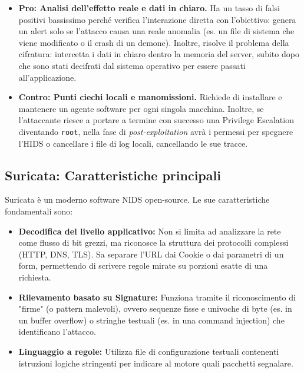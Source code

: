 \documentclass[12pt,a4paper]{report}
\begin{document}
	\begin{itemize}
		\item \textbf{Pro: Analisi dell'effetto reale e dati in chiaro.} Ha un tasso di falsi positivi bassissimo perché verifica l'interazione diretta con l'obiettivo: genera un alert solo se l'attacco causa una reale anomalia (es. un file di sistema che viene modificato o il crash di un demone). Inoltre, risolve il problema della cifratura: intercetta i dati in chiaro dentro la memoria del server, subito dopo che sono stati decifrati dal sistema operativo per essere passati all'applicazione.
		\item \textbf{Contro: Punti ciechi locali e manomissioni.} Richiede di installare e mantenere un agente software per ogni singola macchina. Inoltre, se l'attaccante riesce a portare a termine con successo una Privilege Escalation diventando \texttt{root}, nella fase di \textit{post-exploitation} avrà i permessi per spegnere l'HIDS o cancellare i file di log locali, cancellando le sue tracce.
	\end{itemize}
	
	\subsection{Suricata: Caratteristiche principali}
	Suricata è un moderno software NIDS open-source. Le sue caratteristiche fondamentali sono:
	\begin{itemize}
		\item \textbf{Decodifica del livello applicativo:} Non si limita ad analizzare la rete come flusso di bit grezzi, ma riconosce la struttura dei protocolli complessi (HTTP, DNS, TLS). Sa separare l'URL dai Cookie o dai parametri di un form, permettendo di scrivere regole mirate su porzioni esatte di una richiesta.
		\item \textbf{Rilevamento basato su Signature:} Funziona tramite il riconoscimento di "firme" (o pattern malevoli), ovvero sequenze fisse e univoche di byte (es. in un buffer overflow) o stringhe testuali (es. in una command injection) che identificano l'attacco.
		\item \textbf{Linguaggio a regole:} Utilizza file di configurazione testuali contenenti istruzioni logiche stringenti per indicare al motore quali pacchetti segnalare.
	\end{itemize}
	
\end{document}
